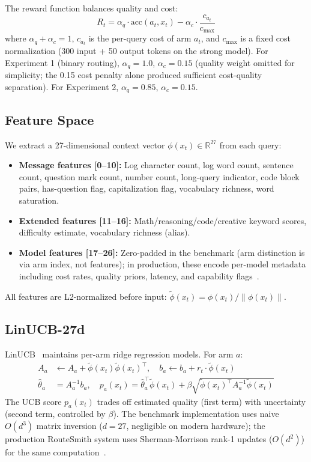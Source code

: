 \documentclass[11pt]{article}
\begin{document}
The reward function balances quality and cost:
\begin{equation}\label{eq:reward}
R_t = \alpha_q \cdot \text{acc}(a_t, x_t) - \alpha_c \cdot \frac{c_{a_t}}{c_{\max}}
\end{equation}
where $\alpha_q + \alpha_c = 1$, $c_{a_t}$ is the per-query cost of arm $a_t$, and $c_{\max}$ is a fixed cost normalization (300 input + 50 output tokens on the strong model). For Experiment 1 (binary routing), $\alpha_q = 1.0$, $\alpha_c = 0.15$ (quality weight omitted for simplicity; the 0.15 cost penalty alone produced sufficient cost-quality separation). For Experiment 2, $\alpha_q = 0.85$, $\alpha_c = 0.15$.

\subsection{Feature Space}
\label{sec:features}

We extract a 27-dimensional context vector $\phi(x_t) \in \mathbb{R}^{27}$ from each query:
\begin{itemize}
    \item \textbf{Message features [0--10]:} Log character count, log word count, sentence count, question mark count, number count, long-query indicator, code block pairs, has-question flag, capitalization flag, vocabulary richness, word saturation.
    \item \textbf{Extended features [11--16]:} Math/reasoning/code/creative keyword scores, difficulty estimate, vocabulary richness (alias).
    \item \textbf{Model features [17--26]:} Zero-padded in the benchmark (arm distinction is via arm index, not features); in production, these encode per-model metadata including cost rates, quality priors, latency, and capability flags~\cite{routesmith2025system}.
\end{itemize}
All features are L2-normalized before input: $\tilde{\phi}(x_t) = \phi(x_t) / \|\phi(x_t)\|$.

\subsection{LinUCB-27d}
\label{sec:linucb}

LinUCB~\cite{li2010contextual} maintains per-arm ridge regression models. For arm $a$:
\begin{align}
A_a &\leftarrow A_a + \tilde{\phi}(x_t)\tilde{\phi}(x_t)^\top, \quad
b_a \leftarrow b_a + r_t \cdot \tilde{\phi}(x_t) \\
\hat{\theta}_a &= A_a^{-1} b_a, \quad
p_a(x_t) = \hat{\theta}_a^\top \tilde{\phi}(x_t) + \beta \sqrt{\tilde{\phi}(x_t)^\top A_a^{-1} \tilde{\phi}(x_t)}
\end{align}
The UCB score $p_a(x_t)$ trades off estimated quality (first term) with uncertainty (second term, controlled by $\beta$). The benchmark implementation uses naive $O(d^3)$ matrix inversion ($d=27$, negligible on modern hardware); the production RouteSmith system uses Sherman-Morrison rank-1 updates ($O(d^2)$) for the same computation~\cite{routesmith2025system}.
\end{document}
